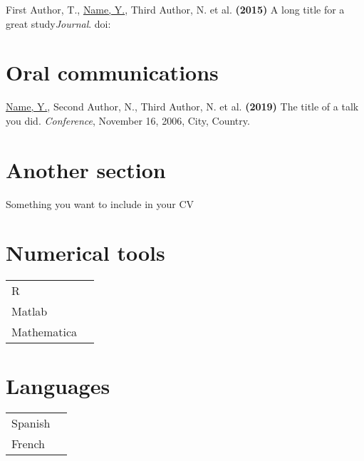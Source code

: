 \documentclass[a4paper,10pt]{article}
\begin{document}
{\begin{minipage}[t]{0.6\textwidth}
\begin{description}
\item First Author, T., \underline{Name, Y.}, Third Author, N. et al. \textbf{(2015)} A long title for a great study{\it Journal}. doi:~

\end{description}

\section*{Oral communications}
\begin{description}
\raggedright
\item \underline{Name, Y.}, Second Author, N., Third Author, N. et al. \textbf{(2019)} The title of a talk you did. {\it Conference}, November 16, 2006, City, Country.
\end{description}

\section*{Another section}
\begin{description}
\raggedright
\item Something you want to include in your CV
\end{description}

\MySkip

\begin{multicols}{2}
\section*{Numerical tools}
\begin{tabular}{ll}
R              & \SkillBull{$\bullet\bullet\bullet\,\circ$} \\
Matlab         & \SkillBull{$\bullet\bullet\bullet\,\circ$} \\
Mathematica    & \SkillBull{$\bullet\,\circ\,\circ\,\circ$} \\
\end{tabular}

\vfill\null \columnbreak

\section*{Languages}
\begin{tabular}{ll}
  Spanish        & \SkillBull{$\bullet \bullet \bullet \, \circ$}\\
  French         & \SkillBull{$\bullet \, \circ \, \circ \, \circ$}\\
\end{tabular}

\end{multicols}

\LastUpdate

\end{minipage}%
}
\end{document}
